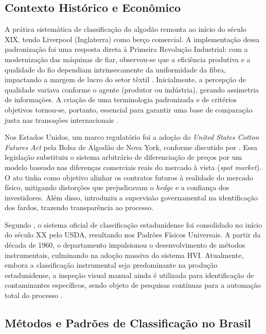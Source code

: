 \subsection{Contexto Histórico e Econômico}

    A prática sistemática de classificação do algodão remonta ao início do século XIX, tendo Liverpool (Inglaterra) como berço comercial. A implementação dessa padronização foi uma resposta direta à Primeira Revolução Industrial: com a modernização das máquinas de fiar, observou-se que a eficiência produtiva e a qualidade do fio dependiam intrinsecamente da uniformidade da fibra, impactando a margem de lucro do setor têxtil \cite{morais2021interpretacao}. Inicialmente, a percepção de qualidade variava conforme o agente (produtor ou indústria), gerando assimetria de informações. A criação de uma terminologia padronizada e de critérios objetivos tornou-se, portanto, essencial para garantir uma base de comparação justa nas transações internacionais \cite{earle1914classification}.

    Nos Estados Unidos, um marco regulatório foi a adoção do \textit{United States Cotton Futures Act} pela Bolsa de Algodão de Nova York, conforme discutido por . Essa legislação substituiu o sistema arbitrário de diferenciação de preços por um modelo baseado nas diferenças comerciais reais do mercado à vista (\textit{spot market}). O ato tinha como objetivo alinhar os contratos futuros à realidade do mercado físico, mitigando distorções que prejudicavam o \textit{hedge} e a confiança dos investidores. Além disso, introduziu a supervisão governamental na identificação dos fardos, trazendo transparência ao processo.

    Segundo , o sistema oficial de classificação estadunidense foi consolidado no início do século XX pelo USDA, resultando nos Padrões Físicos Universais. A partir da década de 1960, o departamento impulsionou o desenvolvimento de métodos instrumentais, culminando na adoção massiva do sistema HVI. Atualmente, embora a classificação instrumental seja predominante na produção estadunidense, a inspeção visual manual ainda é utilizada para identificação de contaminantes específicos, sendo objeto de pesquisas contínuas para a automação total do processo \cite{knowlton2005usda, cottoninc2020classification}.


\subsection{Métodos e Padrões de Classificação no Brasil}

